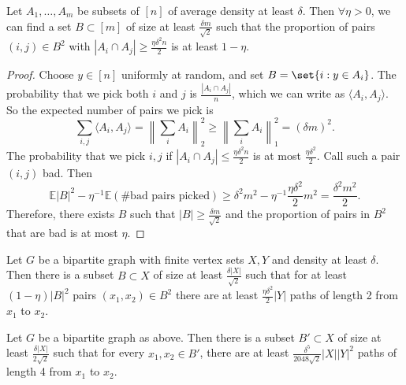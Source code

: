 \documentclass{article}
\newcommand{\1}[1]{\mathbbm{1}_{#1}}
\begin{document}
\begin{nlemma}\label{lem:2.8}
  Let $A_1, \dotsc, A_m$ be subsets of $[n]$ of average density at least $\delta$.
  Then $\forall \eta > 0$, we can find a set $B \subset [m]$ of size at least $\frac{\delta m}{\sqrt 2}$ such that the proportion of pairs $(i,j) \in B^2$ with $|A_i \cap A_j| \geq \frac{\eta \delta^2 n}{2}$ is at least $1-\eta$.
\end{nlemma}
\begin{proof}
  Choose $y \in [n]$ uniformly at random, and set $B = \set{i : y \in A_i}$.
  The probability that we pick both $i$ and $j$ is $\frac{|A_i \cap A_j|}{n}$, which we can write as $\langle A_i, A_j \rangle$.
  So the expected number of pairs we pick is
  \begin{equation*}
    \sum_{i,j} \langle A_i, A_j \rangle = \left\|\sum_i A_i \right\|_2^2 \geq \left\|\sum_{i} A_i\right\|^2_1 = (\delta m)^2.
  \end{equation*}
  The probability that we pick $i,j$ if $|A_i \cap A_j| \leq \frac{\eta \delta^2 n}{2}$ is at most $\frac{\eta \delta^2}{2}$.
  Call such a pair $(i,j)$ bad.
  Then
  \begin{equation*}
    \mathbb{E} |B|^2 - \eta^{-1} \mathbb{E}(\# \text{bad pairs picked}) \geq \delta^2 m^2 - \eta^{-1} \frac{\eta \delta^2}{2} m^2 = \frac{\delta^2 m^2}{2}.
  \end{equation*}
  Therefore, there exists $B$ such that $|B| \geq \frac{\delta m}{\sqrt{2}}$ and the proportion of pairs in $B^2$ that are bad is at most $\eta$.
\end{proof}
\begin{ncor}\label{cor:2.9}
  Let $G$ be a bipartite graph with finite vertex sets $X,Y$ and density at least $\delta$.
  Then there is a subset $B \subset X$ of size at least $\frac{\delta |X|}{\sqrt{2}}$ such that for at least $(1-\eta)|B|^2$ pairs $(x_1, x_2) \in B^2$ there are at least $\frac{\eta \delta^2}{2} |Y|$ paths of length 2 from $x_1$ to $x_2$.
\end{ncor}
\begin{ncor}\label{cor:2.10}
  Let $G$ be a bipartite graph as above.
  Then there is a subset $B' \subset X$ of size at least $\frac{\delta|X|}{2 \sqrt{2}}$ such that for every $x_1, x_2 \in B'$, there are at least $\frac{\delta^5}{2048 \sqrt{2}} |X||Y|^2$ paths of length 4 from $x_1$ to $x_2$.
\end{ncor}
\end{document}
